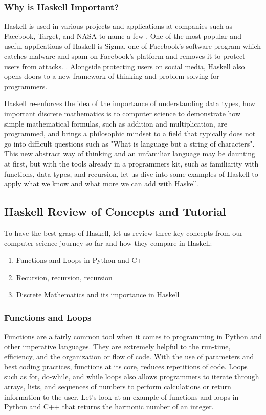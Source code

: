 \documentclass{article}
\begin{document}
\medskip\noindent
\subsubsection{Why is Haskell Important?}
Haskell is used in various projects and applications at companies such as Facebook, Target, and NASA to name a few \cite{serokell.io}. One of the most popular and useful applications of Haskell is Sigma, one of Facebook's software program which catches malware and spam on Facebook's platform and removes it to protect users from attacks. \cite{Facebook Engineering}. Alongside protecting users on social media, Haskell also opens doors to a new framework of thinking and problem solving for programmers. 

\medskip\noindent
Haskell re-enforces the idea of the importance of understanding data types, how important discrete mathematics is to computer science to demonstrate how simple mathematical formulas, such as addition and multiplication, are programmed, and brings a philosophic mindset to a field that typically does not go into difficult questions such as "What is language but a string of characters". This new abstract way of thinking and an unfamiliar language may be daunting at first, but with the tools already in a programmers kit, such as familiarity with functions, data types, and recursion, let us dive into some examples of Haskell to apply what we know and what more we can add with Haskell.

\subsection{Haskell Review of Concepts and Tutorial}

To have the best grasp of Haskell, let us review three key concepts from our computer science journey so far and how they compare in Haskell:

\begin{enumerate}
    \item Functions and Loops in Python and C++
    \item Recursion, recursion, recursion
    \item Discrete Mathematics and its importance in Haskell
\end{enumerate}

\subsubsection{Functions and Loops}
Functions are a fairly common tool when it comes to programming in Python and other imperative languages. They are extremely helpful to the run-time, efficiency, and the organization or flow of code. With the use of parameters and best coding practices, functions at its core, reduces repetitions of code. Loops such as for, do-while, and while loops also allows programmers to iterate through arrays, lists, and sequences of numbers to perform calculations or return information to the user. Let's look at an example of functions and loops in Python and C++ that returns the harmonic number of an integer. 
\end{document}
